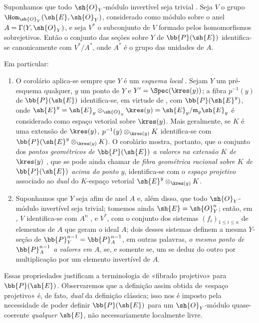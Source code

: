 \documentclass[oneside,10pt]{amsart}
\renewcommand{\leq}{\leqslant}
\newcommand{\oldpage}[2][]{\marginnote{\normalfont\footnotesize\textbf{#1}~|~#2}\ignorespaces}
\let\EGAOriginalLabel\label
\renewcommand{\label}[1]{\phantomsection\EGAOriginalLabel{#1}}
\begin{document}
\begin{corollary}[4.2.6]
\label{II.4.2.6}
Suponhamos que todo $\sh{O}_Y$-módulo invertível seja trivial .
Seja $V$ o grupo $\Hom_{\sh{O}_Y}(\sh{E},\sh{O}_Y)$, considerado como módulo sobre o anel $A=\Gamma(Y,\sh{O}_Y)$, e seja $V^*$ o subconjunto de $V$ formado pelos homomorfismos sobrejetivos.
Então o conjunto das seções sobre $Y$ de $\bb{P}(\sh{E})$ identifica-se canonicamente com $V^*/A^*$, onde $A^*$ é o grupo das unidades de $A$.
\end{corollary}
\oldpage[II]{75}
Em particular:
\begin{enumerate}
  \item O corolário  aplica-se sempre que $Y$ é um \emph{esquema local} .
    Sejam $Y$ um pré-esquema qualquer, $y$ um ponto de $Y$ e $Y'=\Spec(\kres(y))$;
    a fibra $p^{-1}(y)$ de $\bb{P}(\sh{E})$ identifica-se, em virtude de , com $\bb{P}(\sh{E}^y)$, onde $\sh{E}^y=\sh{E}_y\otimes_{\sh{O}_y}\kres(y)=\sh{E}_y/\mathfrak{m}_y\sh{E}_y$ é considerado como espaço vetorial sobre $\kres(y)$.
    Mais geralmente, se $K$ é uma extensão de $\kres(y)$, $p^{-1}(y)\otimes_{\kres(y)}K$ identifica-se com $\bb{P}(\sh{E}^y\otimes_{\kres(y)}K)$.
    O corolário  mostra, portanto, que o conjunto dos \emph{pontos geométricos de $\bb{P}(\sh{E})$ a valores na extensão $K$ de $\kres(y)$} , que se pode ainda chamar de \emph{fibra geométrica racional sobre $K$ de $\bb{P}(\sh{E})$ acima do ponto $y$}, identifica-se com o \emph{espaço projetivo} associado ao \emph{dual} do $K$-espaço vetorial $\sh{E}^y\otimes_{\kres(y)}K$.
  \item Suponhamos que $Y$ seja afim de anel $A$ e, além disso, que todo $\sh{O}_Y$-módulo invertível seja trivial;
    tomemos ainda $\sh{E}=\sh{O}_Y^n$;
    então, em , $V$ identifica-se com $A^n$ , e $V^*$, com o conjunto dos sistemas $(f_i)_{1\leq i\leq n}$ de elementos de $A$ que geram o ideal $A$;
    dois desses sistemas definem a mesma $Y$-seção de $\bb{P}_Y^{n-1}=\bb{P}_A^{n-1}$, em outras palavras, \emph{o mesmo ponto de $\bb{P}_A^{n-1}$ a valores em $A$}, se, e somente se, um se deduz do outro por multiplicação por um elemento invertível de $A$.
\end{enumerate}

Essas propriedades justificam a terminologia de «fibrado projetivo» para $\bb{P}(\sh{E})$.
Observaremos que a definição assim obtida de «espaço projetivo» é, de fato, \emph{dual} da definição clássica;
isso nos é imposto pela necessidade de poder definir $\bb{P}(\sh{E})$ para um $\sh{O}_Y$-módulo quase-coerente \emph{qualquer} $\sh{E}$, não necessariamente localmente livre.
\end{document}
